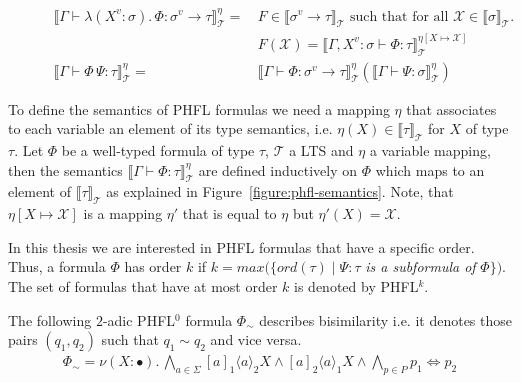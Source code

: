 \begin{figure}
\begin{align*}
        \llbracket \Gamma \vdash \lambda (X^v \colon \sigma).\,\Phi \colon \sigma^v \rightarrow \tau \rrbracket
        ^\eta_\mathcal{T} =\,& F \in \llbracket \sigma^v \rightarrow \tau \rrbracket_\mathcal{T} \text{ such that for
        all }
        \mathcal{X} \in \llbracket \sigma \rrbracket_\mathcal{T}.\, \\
        &F(\mathcal{X}) = \llbracket \Gamma, X^v \colon \sigma \vdash \Phi \colon \tau \rrbracket^{\eta[X \mapsto
        \mathcal{X}]}_\mathcal{T}\\
        \llbracket \Gamma \vdash \Phi\,\Psi \colon \tau \rrbracket^\eta_\mathcal{T} =\,& \llbracket \Gamma \vdash \Phi
        \colon \sigma
        ^v \rightarrow \tau \rrbracket ^\eta_\mathcal{T}(\llbracket \Gamma \vdash \Psi \colon \sigma \rrbracket ^\eta_\mathcal{T})
    \end{align*}
\end{figure}

To define the semantics of PHFL formulas we need a mapping $\eta$ that associates to each variable an element of its
type semantics, i.e. $\eta(X) \in \llbracket\tau\rrbracket_\mathcal{T}$ for $X$ of type $\tau$. Let $\Phi$ be a
well-typed formula of type $\tau$, $\mathcal{T}$ a LTS and $\eta$ a variable mapping, then the semantics
$\llbracket\Gamma \vdash \Phi\colon \tau \rrbracket^\eta_\mathcal{T}$ are defined inductively on $\Phi$ which maps to
an element of $\llbracket\tau\rrbracket_\mathcal{T}$ as explained in Figure~\ref{figure:phfl-semantics}.
Note, that $\eta[X \mapsto \mathcal{X}]$ is a mapping $\eta'$ that is equal to $\eta$ but $\eta'(X) = \mathcal{X}$.

In this thesis we are interested in PHFL formulas that have a specific order. Thus, a formula $\Phi$ has order $k$
if $k = max(\{ord(\tau)\mid \Psi \colon \tau$ \textit{is a subformula of} $\Phi\})$. The set of formulas that have at most
order $k$ is denoted by PHFL$^k$.

\begin{example}{\cite{lange2014capturing}}
    \label{example:phfl_order_0}
    The following $2$-adic PHFL$^0$ formula $\Phi_\sim$ describes bisimilarity i.e. it denotes
    those pairs $(q_1, q_2)$ such that $q_1 \sim q_2$ and vice versa.
    \begin{align*}
        \Phi_\sim = \nu (X \colon \bullet).\,
        \underset{a \in \Sigma}{\bigwedge} [a]_1 \langle a \rangle_2 X \wedge [a]_2 \langle a \rangle_1 X \wedge
        \underset{p \in P}{\bigwedge} p_1 \Leftrightarrow p_2
    \end{align*}
\end{example}

